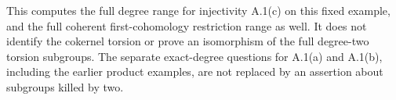 \begin{remark}
\label{rem:OC-exact-degree-scope}
This computes the full degree range for injectivity A.1(c) on this fixed example, and the full coherent first-cohomology restriction range as well.  It does not identify the cokernel torsion or prove an isomorphism of the full degree-two torsion subgroups.  The separate exact-degree questions for A.1(a) and A.1(b), including the earlier product examples, are not replaced by an assertion about subgroups killed by two.
\end{remark}
